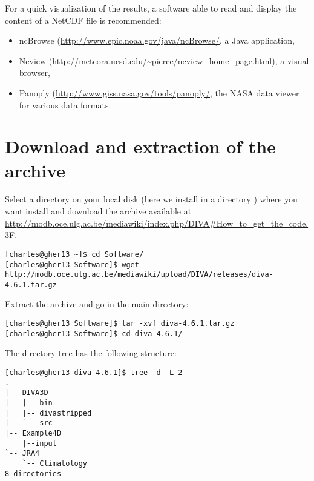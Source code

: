 For a quick visualization of the results, a software able to read and display the content of a NetCDF  file is recommended:
\begin{itemize}
\item ncBrowse (\url{http://www.epic.noaa.gov/java/ncBrowse/}, a Java application,
\item Ncview (\url{http://meteora.ucsd.edu/~pierce/ncview_home_page.html}), a visual browser, 
\item Panoply (\url{http://www.giss.nasa.gov/tools/panoply/}, the NASA data viewer for various data formats.
\end{itemize}


\section{Download and extraction of the archive}
Select a directory on your local disk (here we install in a directory ) where you want install \diva and download the archive available at \url{http://modb.oce.ulg.ac.be/mediawiki/index.php/DIVA#How_to_get_the_code.3F}.

\begin{lstlisting}[style=Bash]
[charles@gher13 ~]$ cd Software/
[charles@gher13 Software]$ wget http://modb.oce.ulg.ac.be/mediawiki/upload/DIVA/releases/diva-4.6.1.tar.gz
\end{lstlisting}

Extract the archive and go in the main directory:
\begin{lstlisting}[style=Bash]
[charles@gher13 Software]$ tar -xvf diva-4.6.1.tar.gz
[charles@gher13 Software]$ cd diva-4.6.1/
\end{lstlisting}

The directory tree has the following structure: %
\begin{lstlisting}[style=Bash]
[charles@gher13 diva-4.6.1]$ tree -d -L 2
.
|-- DIVA3D
|   |-- bin
|   |-- divastripped
|   `-- src
|-- Example4D
	|--input
`-- JRA4
    `-- Climatology
8 directories
\end{lstlisting}


